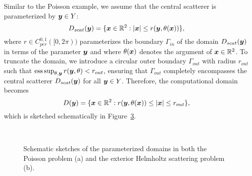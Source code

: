 Similar to the Poisson example, we assume that the central scatterer is parameterized by ${\bm{y}}\in Y$:
\begin{equation}
    D_{scat}({\bm{y}}) = \{ {{\bm{x}}} \in \mathbb{R}^2: |{{\bm{x}}}| \leq r({\bm{y}},\theta({{\bm{x}}})) \},\label{eq:starshapescat}
\end{equation}
where $r \in C^{0, 1}_{per}([0, 2\pi))$ parameterizes the boundary $\Gamma_{in}$ of the domain $D_{scat}({\bm{y}})$ in terms of the parameter ${\bm{y}}$ and where $\theta({{\bm{x}}})$ denotes the argument of ${{\bm{x}}}\in\mathbb{R}^2$.
To truncate the domain, we introduce a circular outer boundary $\Gamma_{out}$ with radius $r_{out}$ such that $\operatorname*{ess\,sup}_{\theta, {\bm{y}}} r({\bm{y}},\theta) < r_{out}$, ensuring that $\Gamma_{out}$ completely encompasses the central scatterer $D_{scat}({\bm{y}})$ for all ${\bm{y}} \in Y$.
Therefore, the computational domain becomes
\begin{equation*}
    {D}({\bm{y}}) = \{ {{\bm{x}}} \in \mathbb{R}^2:  r({\bm{y}},\theta({{\bm{x}}})) \leq |{{\bm{x}}}| \leq  r_{out}\},\label{eq:starshapehelmholtzdomain}
\end{equation*}
which is sketched schematically in Figure~\ref{fig:helmholtzsketch}.

\begin{figure}
    \centering
    \begin{subfigure}[b]{0.49\textwidth}
        \centering
        \caption{}\label{fig:poissonsketch}
    \end{subfigure}%
    ~
    \begin{subfigure}[b]{0.49\textwidth}
        \centering
        \caption{}\label{fig:helmholtzsketch}
    \end{subfigure}
    \caption{Schematic sketches of the parameterized domains in both the Poisson problem (a) and the exterior Helmholtz scattering problem (b).}
\end{figure}